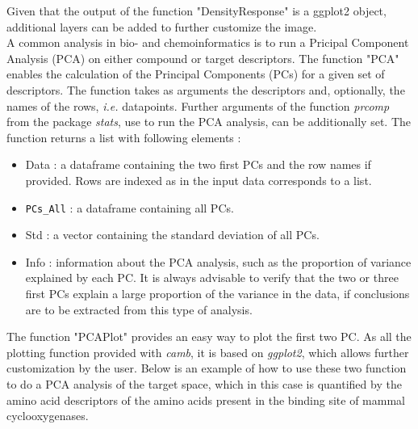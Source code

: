 \documentclass[twoside,a4wide,12pt]{article}\usepackage[]{graphicx}\usepackage[]{color}
\begin{document}
Given that the output of the function "DensityResponse" is a ggplot2 object, additional layers can be added to further customize the image.\\
A common analysis in bio- and chemoinformatics is to run a Pricipal Component Analysis (PCA) on either compound or target descriptors. 
The function "PCA" enables the calculation of the Principal Components (PCs) for a given set of descriptors.
The function takes as arguments the descriptors and, optionally, the names of the rows, {\it i.e.} datapoints.
Further arguments of the function {\it prcomp} from the package {\it stats}, use to run the PCA analysis, can be additionally set.
The function returns a list with following elements :
\begin{itemize}
\item Data : a dataframe containing the two first PCs and the row names if provided. 
Rows are indexed as in the input data corresponds to a list.
\item \verb|PCs_All| : a dataframe containing all PCs.
\item Std : a vector containing the standard deviation of all PCs.
\item Info : information about the PCA analysis, such as the proportion of variance explained by each PC.
It is always advisable to verify that the two or three first PCs explain a large proportion of the variance in the data,
if conclusions are to be extracted from this type of analysis.
\end{itemize}
The function "PCAPlot" provides an easy way to plot the first two PC. 
As all the plotting function provided with {\it camb}, it is based on 
{\it ggplot2}, which allows further customization by the user.
Below is an example of how to use these two function to do a PCA analysis of the target space, 
which in this case is quantified by the amino acid descriptors of the amino acids present in the binding site
of mammal cyclooxygenases.
\end{document}
